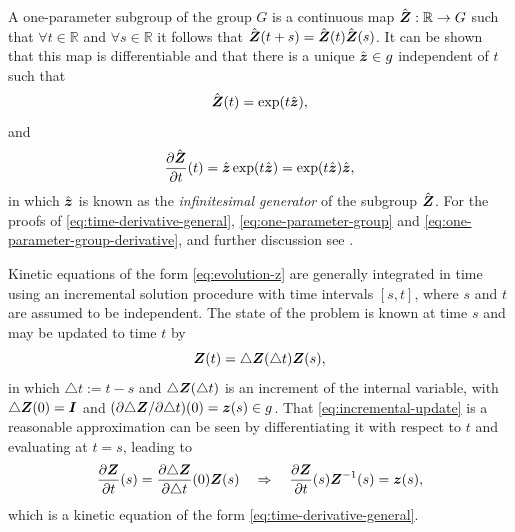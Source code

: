 \documentclass[12pt]{article}
\newcommand{\mbb}[1]{\mathbb{#1}}
\begin{document}
A one-parameter subgroup of the group $G$ is a continuous map
$\hat{\bZ} : \mbb{R} \to G$ such that $\forall t \in \mbb{R}$ and
$\forall s \in \mbb{R}$ it follows that $\hat{{\boldsymbol{Z}}}(t+s) =
\hat{{\boldsymbol{Z}}}(t)\hat{{\boldsymbol{Z}}}(s)$. It can be shown that this map is
differentiable and that there is a unique $\hat{{\boldsymbol{z}}} \in g$
independent of $t$ such that
\begin{equation} \label{eq:one-parameter-group}
  \hat{{\boldsymbol{Z}}}(t) = \exp(t \hat{{\boldsymbol{z}}}),
\end{equation}
and
\begin{equation} \label{eq:one-parameter-group-derivative}
  \frac{\partial \hat{{\boldsymbol{Z}}}}{\partial t}(t) =
  \hat{{\boldsymbol{z}}} \exp(t \hat{{\boldsymbol{z}}}) = \exp(t \hat{{\boldsymbol{z}}}) \hat{{\boldsymbol{z}}},
\end{equation}
in which $\hat{{\boldsymbol{z}}}$ is known as the \emph{infinitesimal generator} of
the subgroup $\hat{{\boldsymbol{Z}}}$. For the proofs of
\eqref{eq:time-derivative-general}, \eqref{eq:one-parameter-group} and
\eqref{eq:one-parameter-group-derivative}, and further discussion see
\citet*{Procesi:2006, Sepanski:2007, Kosmann-Schwarzbach:2009,
  Gallier:2011}.

Kinetic equations of the form \eqref{eq:evolution-z} are generally
integrated in time using an incremental solution procedure with time
intervals $[s, t]$, where $s$ and $t$ are assumed to be
independent. The state of the problem is known at time $s$ and may be
updated to time $t$ by
\begin{equation} \label{eq:incremental-update}
  {\boldsymbol{Z}}(t) = \triangle {\boldsymbol{Z}}(\triangle t) {\boldsymbol{Z}}(s),
\end{equation}
in which $\triangle t := t-s$ and $\triangle {\boldsymbol{Z}}(\triangle t)$ is an
increment of the internal variable, with $\triangle {\boldsymbol{Z}}(0) = {\boldsymbol{I}}$ and
$(\partial \triangle {\boldsymbol{Z}} / \partial \triangle t)(0) = {\boldsymbol{z}}(s) \in
g$. That \eqref{eq:incremental-update} is a reasonable
approximation can be seen by differentiating it
with respect to $t$ and evaluating at $t = s$, leading to
\begin{equation}\label{eq:evolution-from-update}
  \frac{\partial {\boldsymbol{Z}}}{\partial t}(s) =
  \frac{\partial \triangle {\boldsymbol{Z}}}{\partial \triangle t}(0) {\boldsymbol{Z}}(s)
  \quad
  \Rightarrow
  \quad
  \frac{\partial {\boldsymbol{Z}}}{\partial t}(s) {\boldsymbol{Z}}^{-1}(s) = {\boldsymbol{z}}(s),
\end{equation}
which is a kinetic equation of the form \eqref{eq:time-derivative-general}.
\end{document}
